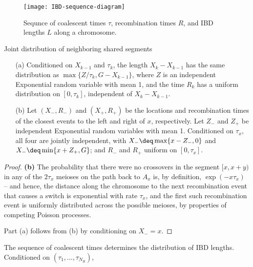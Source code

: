 \begin{figure}[ht!]
  \begin{center}
    \texttt{[image: IBD-sequence-diagram]}
  \end{center}
  \caption{
  Sequnce of coalescent times $\tau$, recombination times $R$, and IBD lengths $L$ along a chromosome.
  }
\end{figure}

\begin{lemma}{Joint distribution of neighboring shared segments}
  \begin{enumerate}
      
    \item[(a)] Conditioned on $X_{k-1}$ and $\tau_{k}$, the length $X_k-X_{k-1}$ has the same distribution as $\max\{Z/\tau_k,G-X_{k-1}\}$,
      where $Z$ is an independent Exponential random variable with mean 1,
      and the time $R_k$ has a uniform distribution on $[0,\tau_k]$, independent of $X_k-X_{k-1}$.

    \item[(b)] Let $(X_-,R_-)$ and $(X_+,R_+)$ be the locations and recombination times of the closest events
      to the left and right of $x$, respectively.
      Let $Z_-$ and $Z_+$ be independent Exponential random variables with mean 1.
      Conditioned on $\tau_x$, all four are jointly independent,
      with $X_- \deq \max\{ x-Z_-, 0 \}$ and $X_- \deq \min\{ x+Z_+, G \}$;
      and $R_-$ and $R_+$ uniform on $[0,\tau_x]$.

  \end{enumerate}
\end{lemma}

\begin{proof}

  \textbf{(b)} The probability that there were no crossovers in the segment $[x,x+y)$ in any of the $2\tau_x$ meioses on the path back to $A_x$
  is, by definition, $\exp(-x \tau_x)$ -- and hence, the distance along the chromosome to the next recombination event that causes a switch is exponential with rate $\tau_x$,
  and the first such recombination event is uniformly distributed across the possible meioses,
  by properties of competing Poisson processes.

  Part (a) follows from (b) by conditioning on $X_- = x$.

\end{proof}

\begin{lemma}{The sequence of coalescent times determines the distribution of IBD lengths.}
  Conditioned on $(\tau_1, \ldots, \tau_{N_R})$, 
\end{lemma}


